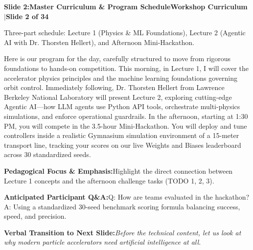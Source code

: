 \documentclass[11pt,a4paper]{article}
\begin{document}
\clearpage
\hypertarget{slide.2}{}
{}
\noindent\begin{tcolorbox}[colback=navy,colframe=navy,left=6pt,right=6pt,top=3pt,bottom=3pt,boxrule=0pt,arc=2pt]
{\large\bfseries\color{white}Slide 2:\enspace Master Curriculum \& Program Schedule}\hfill{\footnotesize\bfseries\color{white!85!lightbg}Workshop Curriculum \enspace$|$\enspace Slide 2 of 34}
\end{tcolorbox}
\vspace{0.2em}
\begin{tcolorbox}[colback=lightbg,colframe=bordergray,title={\footnotesize\bfseries\color{darkgray}Slide Visual Blueprint},fontupper=\small,left=6pt,right=6pt,top=2.5pt,bottom=2.5pt,boxrule=0.6pt,arc=2.5pt]
Three-part schedule: Lecture 1 (Physics \& ML Foundations), Lecture 2 (Agentic AI with Dr. Thorsten Hellert), and Afternoon Mini-Hackathon.
\end{tcolorbox}
\vspace{0.2em}
\begin{tcolorbox}[colback=white,colframe=primaryblue,title={\footnotesize\bfseries\color{white}Spoken Presenter Script},fontupper=\small,left=6pt,right=6pt,top=3pt,bottom=3pt,boxrule=0.8pt,arc=2.5pt]
Here is our program for the day, carefully structured to move from rigorous foundations to hands-on competition. This morning, in Lecture 1, I will cover the accelerator physics principles and the machine learning foundations governing orbit control. Immediately following, Dr. Thorsten Hellert from Lawrence Berkeley National Laboratory will present Lecture 2, exploring cutting-edge Agentic AI—how LLM agents use Python API tools, orchestrate multi-physics simulations, and enforce operational guardrails. In the afternoon, starting at 1:30 PM, you will compete in the 3.5-hour Mini-Hackathon. You will deploy and tune controllers inside a realistic Gymnasium simulation environment of a 15-meter transport line, tracking your scores on our live Weights and Biases leaderboard across 30 standardized seeds.
\end{tcolorbox}
\vspace{0.2em}
\begin{tcolorbox}[colback=lightbg,colframe=bordergray,left=6pt,right=6pt,top=3pt,bottom=3pt,boxrule=0.6pt,arc=2.5pt]
\small
\noindent\textbf{\color{navy}Pedagogical Focus \& Emphasis:}\enspace Highlight the direct connection between Lecture 1 concepts and the afternoon challenge tasks (TODO 1, 2, 3).\par\vspace{0.3em}
\noindent\textbf{\color{successgreen}Anticipated Participant Q\&A:}\enspace Q: How are teams evaluated in the hackathon? A: Using a standardized 30-seed benchmark scoring formula balancing success, speed, and precision.\par\vspace{0.3em}
\noindent\textbf{\color{accent}Verbal Transition to Next Slide:}\enspace \emph{Before the technical content, let us look at why modern particle accelerators need artificial intelligence at all.}
\end{tcolorbox}
\end{document}
